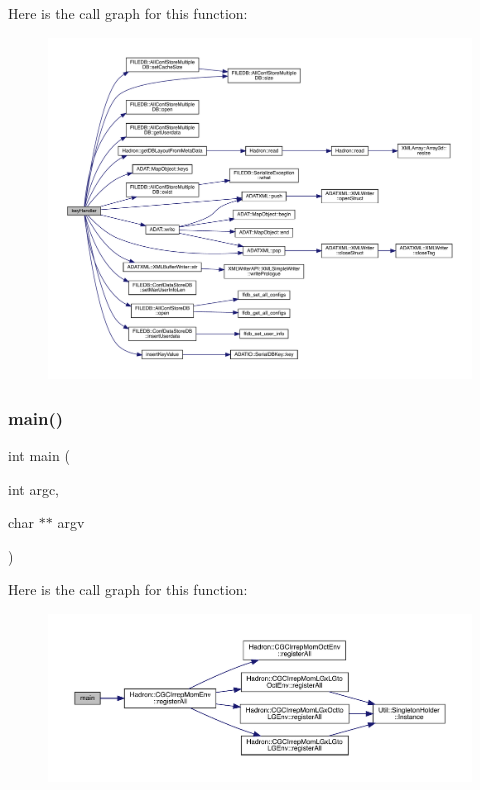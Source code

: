 Here is the call graph for this function\+:
\nopagebreak
\begin{figure}[H]
\begin{center}
\leavevmode
\includegraphics[width=350pt]{d2/d95/adat-devel_2main_2dbutil_2dbavgsrc_8cc_a57918e290614430413950cb4fdfd967e_cgraph}
\end{center}
\end{figure}
\mbox{\label{adat-devel_2main_2dbutil_2dbavgsrc_8cc_a3c04138a5bfe5d72780bb7e82a18e627}} 
\subsubsection{\texorpdfstring{main()}{main()}}
{\footnotesize\ttfamily int main (\begin{DoxyParamCaption}\item[{int}]{argc,  }\item[{char $\ast$$\ast$}]{argv }\end{DoxyParamCaption})}

Here is the call graph for this function\+:
\nopagebreak
\begin{figure}[H]
\begin{center}
\leavevmode
\includegraphics[width=350pt]{d2/d95/adat-devel_2main_2dbutil_2dbavgsrc_8cc_a3c04138a5bfe5d72780bb7e82a18e627_cgraph}
\end{center}
\end{figure}
\mbox{\label{adat-devel_2main_2dbutil_2dbavgsrc_8cc_a33447e6fad2309888af972847134b8bb}} 
